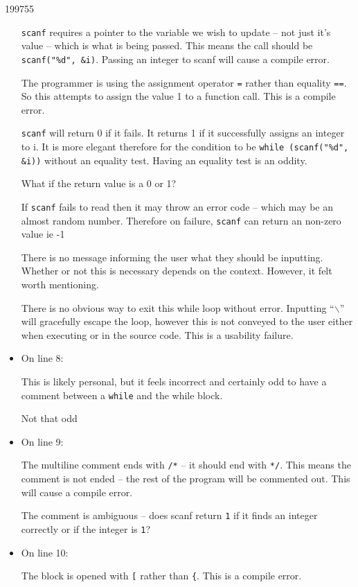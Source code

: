 \documentclass[10pt,\jkfside,a4paper]{article}
\begin{document}
\begin{examquestion}{1997}{5}{5}
\begin{itemize}
\texttt{scanf} requires a pointer to the variable we wish to update -- not
just it's value -- which is what is being passed. This means the call should be
\texttt{scanf("\%d", \&i)}. Passing an integer to scanf will cause a compile
error.

The programmer is using the assignment operator \texttt{=} rather than equality
\texttt{==}. So this attempts to assign the value 1 to a function call. This
is a compile error.

\texttt{scanf} will return 0 if it fails. It returns 1 if it successfully
assigns an integer to i. It is more elegant therefore for the condition to
be \texttt{while (scanf("\%d", \&i))} without an equality test. Having an
equality test is an oddity.

{\color{blue} What if the return value is a 0 or 1?}

{\color{blue} If \texttt{scanf} fails to read then it may throw an error code
-- which may be an almost random number. Therefore on failure, \texttt{scanf} can
return an non-zero value ie -1}

There is no message informing the user what they should be inputting.
Whether or not this is necessary depends on the context. However, it felt
worth mentioning.

There is no obvious way to exit this while loop without error. Inputting
``$\backslash$'' will gracefully escape the loop, however this is not conveyed
to the user either when executing or in the source code. This is a usability
failure.

\item On line 8:

This is likely personal, but it feels incorrect and certainly odd to have a
comment between a \texttt{while} and the while block.

{\color{blue} Not that odd}

\item On line 9:

The multiline comment ends with \texttt{/*} -- it should end with \texttt{*/}.
This means the comment is not ended -- the rest of the program will be
commented out. This will cause a compile error.

The comment is ambiguous -- does scanf return \texttt{1} if it finds an integer
correctly or if the integer is \texttt{1}?

\item On line 10:

The block is opened with \texttt{[} rather than \texttt{\{}. This is a compile error.


\end{itemize}
\end{examquestion}
\end{document}
